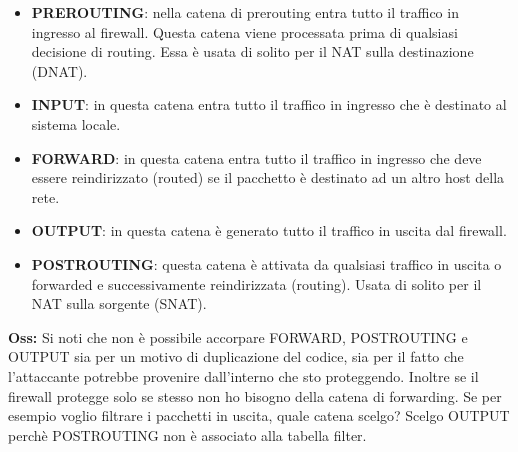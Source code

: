 \begin{itemize}
\item \textbf{PREROUTING}: nella catena di prerouting entra tutto il traffico in ingresso al firewall. Questa catena viene processata prima di qualsiasi decisione di routing. Essa è usata di solito per il NAT sulla destinazione (DNAT).
\item \textbf{INPUT}: in questa catena entra tutto il traffico in ingresso che è destinato al sistema locale.
\item \textbf{FORWARD}: in questa catena entra tutto il traffico in ingresso che deve essere reindirizzato (routed) se il pacchetto è destinato ad un altro host della rete. 
\item \textbf{OUTPUT}: in questa catena è generato tutto il traffico in uscita dal firewall.
\item \textbf{POSTROUTING}: questa catena è attivata da qualsiasi traffico in uscita o forwarded e successivamente reindirizzata (routing). Usata di solito per il NAT sulla sorgente (SNAT).
\end{itemize}

\textbf{Oss:} Si noti che non è possibile accorpare FORWARD, POSTROUTING e OUTPUT sia per un motivo di duplicazione del codice, sia per il fatto che l'attaccante potrebbe provenire dall'interno che sto proteggendo. Inoltre se il firewall protegge solo se stesso non ho bisogno della catena di forwarding. Se per esempio voglio filtrare i pacchetti in uscita, quale catena scelgo? Scelgo OUTPUT perchè POSTROUTING non è associato alla tabella filter.\\

